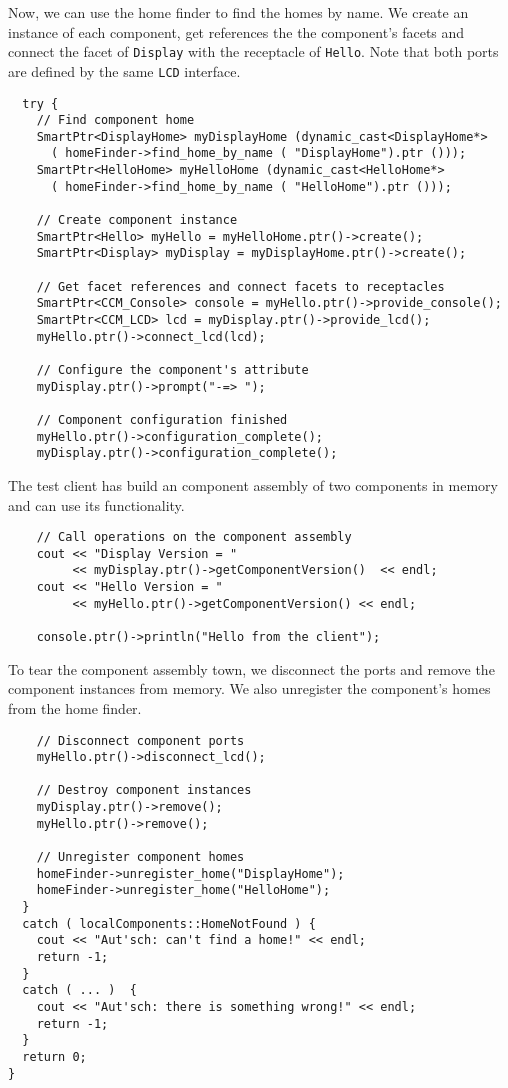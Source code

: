 \noindent
Now, we can use the home finder to find the homes by name.
We create an instance of each component, get references the the component's
facets and connect the facet of {\tt Display} with the receptacle of {\tt Hello}.
Note that both ports are defined by the same {\tt LCD} interface.
\begin{small}
\begin{verbatim}
  try {
    // Find component home
    SmartPtr<DisplayHome> myDisplayHome (dynamic_cast<DisplayHome*>
      ( homeFinder->find_home_by_name ( "DisplayHome").ptr ()));
    SmartPtr<HelloHome> myHelloHome (dynamic_cast<HelloHome*>
      ( homeFinder->find_home_by_name ( "HelloHome").ptr ()));

    // Create component instance
    SmartPtr<Hello> myHello = myHelloHome.ptr()->create();
    SmartPtr<Display> myDisplay = myDisplayHome.ptr()->create();
 
    // Get facet references and connect facets to receptacles
    SmartPtr<CCM_Console> console = myHello.ptr()->provide_console();	
    SmartPtr<CCM_LCD> lcd = myDisplay.ptr()->provide_lcd();
    myHello.ptr()->connect_lcd(lcd);

    // Configure the component's attribute
    myDisplay.ptr()->prompt("-=> ");

    // Component configuration finished	
    myHello.ptr()->configuration_complete();
    myDisplay.ptr()->configuration_complete();
\end{verbatim}
\end{small}

\noindent
The test client has build an component assembly of two components in memory and
can use its functionality. 
\begin{small}
\begin{verbatim}  
    // Call operations on the component assembly
    cout << "Display Version = " 
         << myDisplay.ptr()->getComponentVersion()  << endl;
    cout << "Hello Version = "  
         << myHello.ptr()->getComponentVersion() << endl;

    console.ptr()->println("Hello from the client");
\end{verbatim}
\end{small}

\noindent
To tear the component assembly town, we disconnect the ports and 
remove the component instances from memory.
We also unregister the component's homes from the home finder.
\begin{small}	
\begin{verbatim}    
    // Disconnect component ports
    myHello.ptr()->disconnect_lcd();    

    // Destroy component instances
    myDisplay.ptr()->remove();
    myHello.ptr()->remove();

    // Unregister component homes
    homeFinder->unregister_home("DisplayHome");
    homeFinder->unregister_home("HelloHome");
  }
  catch ( localComponents::HomeNotFound ) {
    cout << "Aut'sch: can't find a home!" << endl;
    return -1;
  }
  catch ( ... )  {
    cout << "Aut'sch: there is something wrong!" << endl;
    return -1;
  }
  return 0;
}
\end{verbatim}
\end{small}


